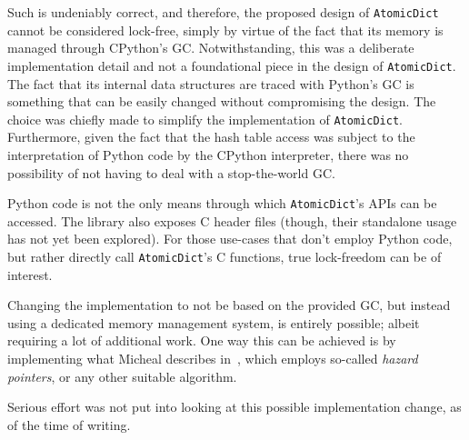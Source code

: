 Such is undeniably correct, and therefore, the proposed design of \texttt{Atomic\-Dict} cannot be considered lock-free, simply by virtue of the fact that its memory is managed through CPython's GC.
Notwithstanding, this was a deliberate implementation detail and not a foundational piece in the design of \texttt{AtomicDict}.
The fact that its internal data structures are traced with Python's GC is something that can be easily changed without compromising the design.
The choice was chiefly made to simplify the implementation of \texttt{AtomicDict}.
Furthermore, given the fact that the hash table access was subject to the interpretation of Python code by the CPython interpreter, there was no possibility of not having to deal with a stop-the-world GC\@.

Python code is not the only means through which \texttt{AtomicDict}'s APIs can be accessed.
The library also exposes C header files (though, their standalone usage has not yet been explored).
For those use-cases that don't employ Python code, but rather directly call \texttt{AtomicDict}'s C functions, true lock-freedom can be of interest.

Changing the implementation to not be based on the provided GC, but instead using a dedicated memory management system, is entirely possible; albeit requiring a lot of additional work.
One way this can be achieved is by implementing what Micheal describes in~\cite{micheal-safe-reclamation}, which employs so-called \emph{hazard pointers}, or any other suitable algorithm.

Serious effort was not put into looking at this possible implementation change, as of the time of writing.

